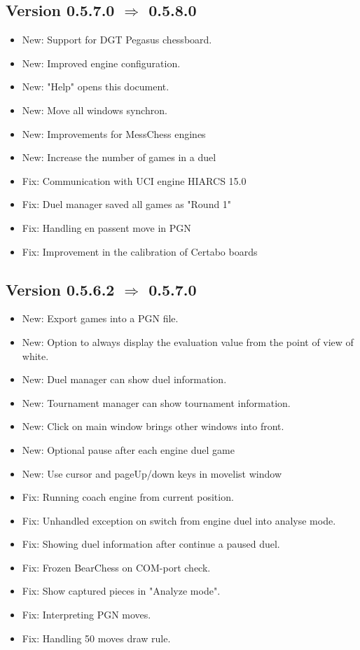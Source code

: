 \documentclass[11pt,a4paper]{article}
\begin{document}
\subsection*{Version 0.5.7.0 $\Rightarrow$  0.5.8.0}
\begin{itemize}
	\item {\color{blue}New}: Support for DGT Pegasus chessboard.
    \item {\color{blue}New}: Improved engine configuration.	
    \item {\color{blue}New}: "Help" opens this document.
	\item {\color{blue}New}: Move all windows synchron.	
	\item {\color{blue}New}: Improvements for MessChess engines
	\item {\color{blue}New}: Increase the number of games in a duel
	\item {\color{red}Fix}: Communication with UCI engine HIARCS 15.0
	\item {\color{red}Fix}: Duel manager saved all games as "Round 1"
	\item {\color{red}Fix}: Handling en passent move in PGN
	\item {\color{red}Fix}: Improvement in the calibration of Certabo boards
\end{itemize}

\subsection*{Version 0.5.6.2 $\Rightarrow$  0.5.7.0}
\begin{itemize}
	\item {\color{blue}New}: Export games into a PGN file.
	\item {\color{blue}New}: Option to always display the evaluation value from the point of view of white.
	\item {\color{blue}New}: Duel manager can show duel information.
	\item {\color{blue}New}: Tournament manager can show tournament information.	
	\item {\color{blue}New}: Click on main window brings other windows into front.
	\item {\color{blue}New}: Optional pause after each engine duel game
	\item {\color{blue}New}: Use cursor and pageUp/down keys in movelist window
	\item {\color{red}Fix}: Running coach engine from current position.
	\item {\color{red}Fix}: Unhandled exception on switch from engine duel into analyse mode.	
	\item {\color{red}Fix}: Showing duel information after continue a paused duel.
	\item {\color{red}Fix}: Frozen BearChess on COM-port check.	
	\item {\color{red}Fix}: Show captured pieces in "Analyze mode".
	\item {\color{red}Fix}: Interpreting PGN moves.
	\item {\color{red}Fix}: Handling 50 moves draw rule.
\end{itemize}
\end{document}
